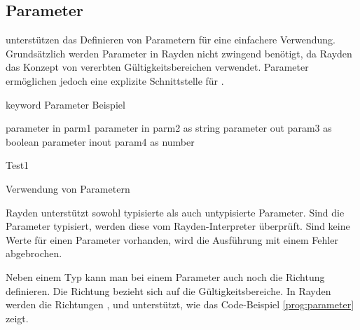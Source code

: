 
\subsection{Parameter}
\label{cha:Parameter}

 unterstützen das Definieren von Parametern für eine einfachere Verwendung. Grundsätzlich werden Parameter in Rayden nicht zwingend benötigt, da Rayden das Konzept von vererbten Gültigkeitsbereichen verwendet. Parameter ermöglichen jedoch eine explizite Schnittstelle für . 

\begin{program}
\begin{JavaCode}
keyword Parameter Beispiel {
	
	parameter in    parm1
	parameter in    parm2 as string
	parameter out   param3 as boolean
	parameter inout param4 as number
	
	Test1	
}
\end{JavaCode}
\caption{Verwendung von Parametern}
\label{prog:parameter}
\end{program}


\SuperPar
Rayden unterstützt sowohl typisierte als auch untypisierte Parameter. Sind die Parameter typisiert, werden diese vom Rayden-Interpreter überprüft. Sind keine Werte für einen Parameter vorhanden, wird die Ausführung mit einem Fehler abgebrochen. 

\SuperPar
Neben einem Typ kann man bei einem Parameter auch noch die Richtung definieren. Die Richtung bezieht sich auf die Gültigkeitsbereiche. In Rayden werden die Richtungen ,  und  unterstützt, wie das Code-Beispiel \ref{prog:parameter} zeigt. \\

